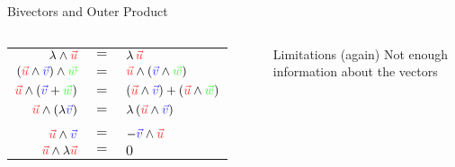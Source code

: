 \begin{frame}[t]{Bivectors and Outer Product}
\begin{columns}
        {
            \begin{tabular}{rcl}
                $\lambda \wedge \textcolor{u}{\vec{u}}$                                                & $=$ & $\lambda\,\textcolor{u}{\vec{u}}$                                                                                 \\
                $(\textcolor{u}{\vec{u}} \wedge \textcolor{v}{\vec{v}}) \wedge \textcolor{w}{\vec{w}}$ & $=$ & $\textcolor{u}{\vec{u}} \wedge (\textcolor{v}{\vec{v}} \wedge \textcolor{w}{\vec{w}})$                            \\
                $\textcolor{u}{\vec{u}} \wedge (\textcolor{v}{\vec{v}} + \textcolor{w}{\vec{w}})$      & $=$ & $(\textcolor{u}{\vec{u}} \wedge \textcolor{v}{\vec{v}}) + (\textcolor{u}{\vec{u}} \wedge \textcolor{w}{\vec{w}})$ \\
                $\textcolor{u}{\vec{u}} \wedge (\lambda \textcolor{v}{\vec{v}})$                       & $=$ & $\lambda\,(\textcolor{u}{\vec{u}} \wedge \textcolor{v}{\vec{v}})$                                                 \\
                \\
                $\textcolor{u}{\vec{u}} \wedge \textcolor{v}{\vec{v}}$                                 & $=$ & $-\textcolor{v}{\vec{v}} \wedge \textcolor{u}{\vec{u}}$                                                           \\
                $\textcolor{u}{\vec{u}} \wedge \lambda \textcolor{u}{\vec{u}}$                         & $=$ & $0$                                                                                                               \\
            \end{tabular}
        }

        \vspace{2em}

        {
            \begin{alertblock}{Limitations (again)}
                Not enough information about the vectors
            \end{alertblock}
        }


        \begin{minipage}[c][0.6\textheight][c]{\linewidth} %
            \centering
            \begin{tikzpicture}


\end{tikzpicture}
\end{minipage}
\end{columns}
\end{frame}
